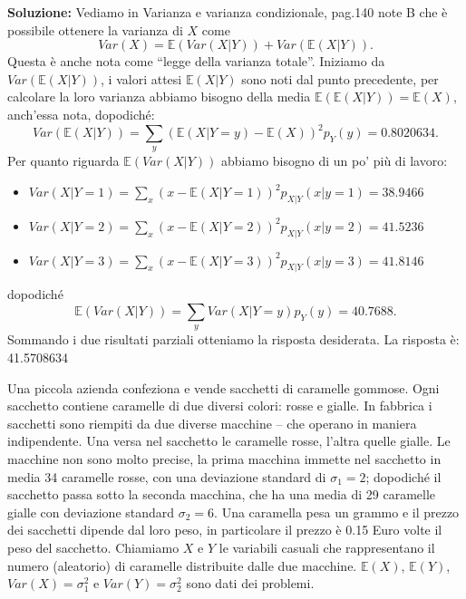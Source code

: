 \documentclass[12pt, a4paper]{article}
\begin{document}
\textbf{Soluzione:}
Vediamo in Varianza e varianza condizionale, pag.140 note B che è possibile ottenere la varianza di $X$ come 
$$ Var(X) = \mathbb{E}(Var(X|Y)) + Var(\mathbb{E}(X|Y)). $$
Questa è anche nota come ``legge della varianza totale''. Iniziamo da $Var(\mathbb{E}(X|Y))$, i valori attesi $\mathbb{E}(X|Y)$ sono noti dal punto precedente, per calcolare la loro varianza abbiamo bisogno della media $\mathbb{E}(\mathbb{E}(X|Y)) = \mathbb{E}(X)$, anch’essa nota, dopodiché: 
$$ Var(\mathbb{E}(X|Y)) = \sum_y (\mathbb{E}(X|Y=y) - \mathbb{E}(X))^2 p_Y(y) = 0.8020634. $$
Per quanto riguarda $\mathbb{E}(Var(X|Y))$ abbiamo bisogno di un po’ più di lavoro: 
\begin{itemize}
    \item $Var(X|Y=1) = \sum_x (x - \mathbb{E}(X|Y=1))^2 p_{X|Y}(x|y=1) = 38.9466$
    \item $Var(X|Y=2) = \sum_x (x - \mathbb{E}(X|Y=2))^2 p_{X|Y}(x|y=2) = 41.5236$
    \item $Var(X|Y=3) = \sum_x (x - \mathbb{E}(X|Y=3))^2 p_{X|Y}(x|y=3) = 41.8146$
\end{itemize}
dopodiché 
$$ \mathbb{E}(Var(X|Y)) = \sum_y Var(X|Y=y)p_Y(y) = 40.7688. $$
Sommando i due risultati parziali otteniamo la risposta desiderata.
La risposta è: 41.5708634


\vspace{0.5cm}
\begin{tcolorbox}[colback=lightergray!10, colframe=tocsec, title=\textbf{Esercizio 4}]
Una piccola azienda confeziona e vende sacchetti di caramelle gommose. Ogni sacchetto contiene caramelle di due diversi colori: rosse e gialle.
In fabbrica i sacchetti sono riempiti da due diverse macchine – che operano in maniera indipendente. Una versa nel sacchetto le caramelle rosse, l’altra quelle gialle. Le macchine non sono molto precise, la prima macchina immette nel sacchetto in media 34 caramelle rosse, con una deviazione standard di $\sigma_1=2$; dopodiché il sacchetto passa sotto la seconda macchina, che ha una media di 29 caramelle gialle con deviazione standard $\sigma_2=6$.
Una caramella pesa un grammo e il prezzo dei sacchetti dipende dal loro peso, in particolare il prezzo è 0.15 Euro volte il peso del sacchetto.
Chiamiamo $X$ e $Y$ le variabili casuali che rappresentano il numero (aleatorio) di caramelle distribuite dalle due macchine. $\mathbb{E}(X)$, $\mathbb{E}(Y)$, $Var(X)=\sigma_1^2$ e $Var(Y)=\sigma_2^2$ sono dati dei problemi.
\end{tcolorbox}
\end{document}

